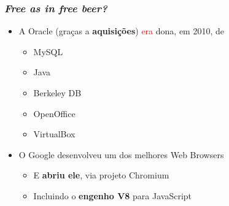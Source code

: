 \documentclass[xcolor=dvipsnames]{beamer}
\newcommand{\tred}[1]{\textcolor{red}{#1}}
\begin{document}
\begin{frame}
	\frametitle{\textit{Free as in free beer?}}
    \begin{itemize}
      \item A Oracle (graças a \textbf{aquisições}) \tred{era} dona, em 2010, de
        \begin{itemize}
        \item MySQL
        \item Java
        \item Berkeley DB
        \item OpenOffice
        \item VirtualBox
        \end{itemize}\pause
      \vspace{0.2cm}
      \item O Google desenvolveu um dos melhores Web Browsers
        \begin{itemize}
        \item E \textbf{abriu ele}, via projeto Chromium
        \item Incluindo o \textbf{engenho V8} para JavaScript
        
        \end{itemize}           
    \end{itemize}
\end{frame}
\end{document}
